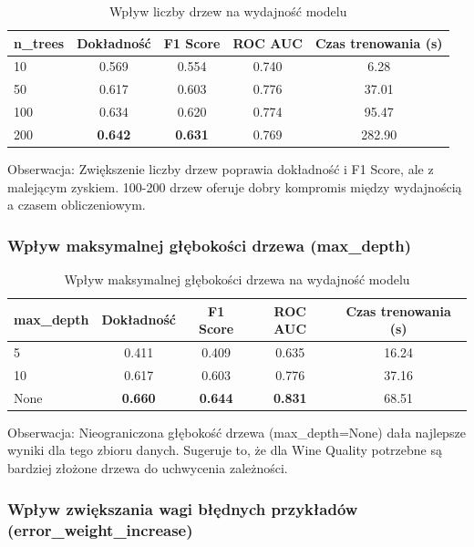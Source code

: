 \documentclass[11pt,a4paper]{article}
\begin{document}
\begin{table}[H]
\centering
\caption{Wpływ liczby drzew na wydajność modelu}
\label{tab:n_trees}
\begin{tabular}{lcccc}
\toprule
n\_trees & Dokładność & F1 Score & ROC AUC & Czas trenowania (s) \\
\midrule
10 & 0.569 & 0.554 & 0.740 & 6.28 \\
50 & 0.617 & 0.603 & 0.776 & 37.01 \\
100 & 0.634 & 0.620 & 0.774 & 95.47 \\
200 & \textbf{0.642} & \textbf{0.631} & 0.769 & 282.90 \\
\bottomrule
\end{tabular}
\end{table}

Obserwacja: Zwiększenie liczby drzew poprawia dokładność i F1 Score, ale z malejącym zyskiem. 100-200 drzew oferuje dobry kompromis między wydajnością a czasem obliczeniowym.

\subsubsection{Wpływ maksymalnej głębokości drzewa (max\_depth)}

\begin{table}[H]
\centering
\caption{Wpływ maksymalnej głębokości drzewa na wydajność modelu}
\label{tab:max_depth}
\begin{tabular}{lcccc}
\toprule
max\_depth & Dokładność & F1 Score & ROC AUC & Czas trenowania (s) \\
\midrule
5 & 0.411 & 0.409 & 0.635 & 16.24 \\
10 & 0.617 & 0.603 & 0.776 & 37.16 \\
None & \textbf{0.660} & \textbf{0.644} & \textbf{0.831} & 68.51 \\
\bottomrule
\end{tabular}
\end{table}

Obserwacja: Nieograniczona głębokość drzewa (max\_depth=None) dała najlepsze wyniki dla tego zbioru danych. Sugeruje to, że dla Wine Quality potrzebne są bardziej złożone drzewa do uchwycenia zależności.

\subsubsection{Wpływ zwiększania wagi błędnych przykładów (error\_weight\_increase)}
\end{document}
